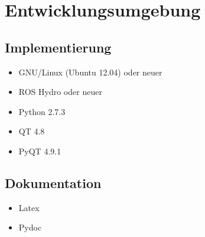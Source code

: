 \chapter{Entwicklungsumgebung}

\section{Implementierung}

\begin{itemize}
  \item GNU/Linux (Ubuntu 12.04) oder neuer
  \item ROS Hydro oder neuer
  \item Python 2.7.3
  \item QT 4.8
  \item PyQT 4.9.1
\end{itemize}

\section{Dokumentation}

\begin{itemize}
  \item Latex
  \item Pydoc
\end{itemize}
